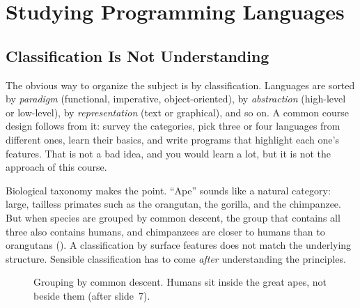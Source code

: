 \section{Studying Programming Languages}
\label{sec:why}

\subsection{Classification Is Not Understanding}

The obvious way to organize the subject is by classification. Languages are sorted by \emph{paradigm} (functional, imperative, object-oriented), by \emph{abstraction} (high-level or low-level), by \emph{representation} (text or graphical), and so on. A common course design follows from it: survey the categories, pick three or four languages from different ones, learn their basics, and write programs that highlight each one's features. That is not a bad idea, and you would learn a lot, but it is not the approach of this course.

Biological taxonomy makes the point. ``Ape'' sounds like a natural category: large, tailless primates such as the orangutan, the gorilla, and the chimpanzee. But when species are grouped by common descent, the group that contains all three also contains humans, and chimpanzees are closer to humans than to orangutans (). A classification by surface features does not match the underlying structure. Sensible classification has to come \emph{after} understanding the principles.

\begin{figure}[htbp]
\centering
{}
\caption{Grouping by common descent. Humans sit inside the great apes, not beside them (after slide~7).}
\label{fig:clade}
\end{figure}

